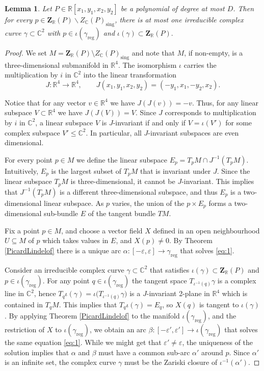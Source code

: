 \documentclass[letterpaper, reqno,11pt]{article}
\newtheorem{lemma}[theorem]{Lemma}
\theoremstyle{remark}
\newcommand{\RR}{\mathbb{R}}
\newcommand{\CC}{\mathbb{C}}
\newcommand{\BZ}{\mathbf{Z}}
\newcommand{\sing}{\operatorname{sing}}
\newcommand{\reg}{\operatorname{reg}}
\begin{document}
\begin{lemma}\label{HyperSurfaceOneLeafThm}
Let $P\in\RR[x_1,y_1,x_2,y_2]$ be a polynomial of degree at most $D$.
Then for every
$p\in \BZ_{\RR}(P)\backslash Z_{\CC}(P)_{\sing}$,
there is at most one irreducible complex curve
$\gamma\subset\CC^2$ with $p\in\iota(\gamma_{\reg})$ and
$\iota(\gamma)\subset \BZ_{\RR}(P).$
\end{lemma}
\begin{proof}
We set $M = \BZ_\RR(P)\setminus Z_{\CC}(P)_{\sing}$
and note that $M$, if non-empty,
is a three-dimensional submanifold in $\RR^4$.
%
The isomorphism $\iota$ carries the multiplication by $i$ in
$\CC^2$ into the linear transformation
%
\[ J:\RR^4\to\RR^4,\quad\quad J(x_1,y_1,x_2,y_2) = (-y_1,x_1,-y_2,x_2). \]

Notice that for any vector $v\in\RR^4$ we have $J(J(v)) = -v$.
Thus, for any linear subspace $V\subset \RR^4$ we have $J(J(V)) = V$.
Since $J$ corresponds to multiplication by $i$ in $\CC^2$, a linear subspace $V$ is $J$-invariant if and only if $V=\iota(V')$ for some complex subspace $V'\le\CC^2$.
In particular, all $J$-invariant subspaces are even dimensional.

For every point $p\in M$ we define the linear subspace $E_p = T_p M \cap J^{-1}(T_p M)$.
Intuitively, $E_p$ is the largest subset of $T_p M$ that is invariant under $J$.
Since the linear subspace $T_p M$ is three-dimensional, it cannot be $J$-invariant.
This implies that $J^{-1}(T_p M)$ is a different three-dimensional subspace,
and thus $E_p$ is a two-dimensional linear subspace.
As $p$ varies, the union of the $p \times E_p$ forms a two-dimensional
sub-bundle $E$ of the tangent bundle $TM$.

Fix a point $p\in M$, and choose a vector field $X$ defined
in an open neighbourhood $U\subseteq M$ of $p$
which takes values in $E$, and $X(p)\ne0$.
By Theorem \ref{PicardLindelof} there is a unique arc
$\alpha:[-\varepsilon,\varepsilon]\to\gamma_{\reg}$
that solves \eqref{eq:1}.

Consider an irreducible complex curve $\gamma\subset\CC^2$
that satisfies
$\iota(\gamma) \subset \BZ_{\RR}(P)$ and
$p\in \iota(\gamma_{\reg})$.
For any point $q\in\iota(\gamma_{\reg})$
the tangent space $T_{\iota^{-1}(q)}\gamma$
is a complex line in $\CC^2$,
hence
$T_{q}\iota(\gamma)=\iota\big(T_{\iota^{-1}(q)}\gamma)$
is a $J$-invariant 2-plane in $\RR^4$
which is contained in $T_{q}M$.
This implies that $T_q\iota(\gamma)=E_q$,
so $X(q)$ is tangent to $\iota(\gamma)$.
By applying Theorem \ref{PicardLindelof} to the manifold
$\iota(\gamma_{\reg})$, and the restriction of $X$ to $\iota(\gamma_{\reg})$,
we obtain an arc
$\beta:[-\varepsilon',\varepsilon']\to\iota(\gamma_{\reg})$
that solves the same equation \eqref{eq:1}.
While we might get that $\varepsilon' \neq \varepsilon$,
the uniqueness of the solution implies that $\alpha$ and $\beta$
must have a common sub-arc $\alpha'$ around $p$.
Since $\alpha'$ is an infinite set,
the complex curve $\gamma$ must be the Zariski closure of $\iota^{-1}(\alpha')$.


\end{proof}
\end{document}

